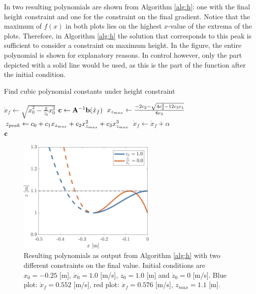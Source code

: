 In  two resulting polynomials are shown from Algorithm \ref{alg:h}: one with the final height constraint and one for the constraint on the final gradient. Notice that the maximum of $f(x)$ in both plots lies on the highest $x$-value of the extrema of the plots. Therefore, in Algorithm \ref{alg:h} the solution that corresponds to this peak is sufficient to consider a constraint on maximum height. In the figure, the entire polynomial is shown for explanatory reasons. In control however, only the part depicted with a solid line would be used, as this is the part of the function after the initial condition.
\begin{algorithm}
\caption{Find cubic polynomial constants under height constraint}
\label{alg:h}
\begin{algorithmic}[1]
    \State $\dot{x}_{f}\gets \sqrt{\dot{x}_0^2-\frac{g}{z_0}x_0^2}$
        \Repeat
            \State $\mathbf{c}\gets \mathbf{A}^{-1}\mathbf{b}(\dot{x}_{f})$ 
            \State $x_{z_{max}}\gets \frac{-2c_2 - \sqrt{4c_2^2-12c_3c_1}}{6c_3}$ 
            \State $z_{peak} \gets c_0 + c_1x_{z_{max}} + c_2x_{z_{max}}^2+ c_3x_{z_{max}}^3$ 
            \State $\dot{x}_{f} \gets \dot{x}_{f}+\alpha$   
        \\
    \Return $\mathbf{c}$
\end{algorithmic}
\end{algorithm}
\begin{figure}
\centering
\includegraphics[width=0.6\textwidth]{STYLESTUFF/polynomialHeightViz.png}
\caption{Resulting polynomials as output from Algorithm \ref{alg:h} with two different constraints on the final value. Initial conditions are $x_0=-0.25$ [m], $\dot{x}_0=1.0$ [m/s], $z_0=1.0$ [m] and $\dot{z}_0=0$ [m/s]. Blue plot: $\dot{x}_f=0.552$ [m/s], red plot: $\dot{x}_f=0.576$ [m/s], $z_{max}=1.1$ [m]. }
\label{fig:polheight}
\end{figure}


